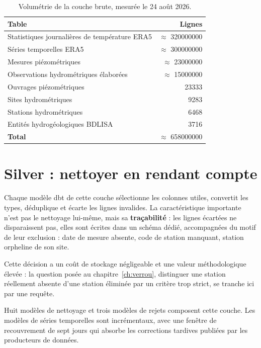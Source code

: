 \begin{table}[H]
\centering
\caption{Volumétrie de la couche brute, mesurée le 24 août 2026.}
\label{tab:volumetrie-bronze}
\begin{tabularx}{\textwidth}{@{}Xr@{}}
\toprule
\textbf{Table} & \textbf{Lignes} \\
\midrule
Statistiques journalières de température ERA5 & $\approx$ \num{320000000} \\
Séries temporelles ERA5 & $\approx$ \num{300000000} \\
Mesures piézométriques & $\approx$ \num{23000000} \\
Observations hydrométriques élaborées & $\approx$ \num{15000000} \\
Ouvrages piézométriques & \num{23333} \\
Sites hydrométriques & \num{9283} \\
Stations hydrométriques & \num{6468} \\
Entités hydrogéologiques BDLISA & \num{3716} \\
\midrule
\textbf{Total} & $\approx$ \num{658000000} \\
\bottomrule
\end{tabularx}
\end{table}

\section{Silver : nettoyer en rendant compte}

Chaque modèle dbt de cette couche sélectionne les colonnes utiles, convertit les types,
déduplique et écarte les lignes invalides. La caractéristique importante n'est pas le nettoyage
lui-même, mais sa \textbf{traçabilité} : les lignes écartées ne disparaissent pas, elles sont
écrites dans un schéma dédié, accompagnées du motif de leur exclusion : date de mesure absente,
code de station manquant, station orpheline de son site.

Cette décision a un coût de stockage négligeable et une valeur méthodologique élevée : la
question posée au chapitre~\ref{ch:verrou}, distinguer une station réellement absente d'une
station éliminée par un critère trop strict, se tranche ici par une requête.

Huit modèles de nettoyage et trois modèles de rejets composent cette couche. Les modèles de
séries temporelles sont incrémentaux, avec une fenêtre de recouvrement de sept jours qui absorbe
les corrections tardives publiées par les producteurs de données.

